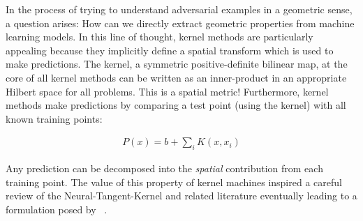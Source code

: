 






In the process of trying to understand adversarial examples in a
geometric sense, a question arises: How can we directly extract
geometric properties from machine learning models. In this line of
thought, kernel methods are particularly appealing because they
implicitly define a spatial transform which is used to make
predictions. The kernel, a symmetric positive-definite bilinear map,
at the core of all kernel methods can be written as an inner-product
in an appropriate Hilbert space for all problems. This is a spatial
metric! Furthermore, kernel methods make predictions by comparing a
test point (using the kernel) with all known training points:

\begin{align}
  P(x) = b + \sum_i K(x, x_i)
\end{align}

Any prediction can be decomposed into the \emph{spatial}
contribution from each training point. The value of this property of kernel machines inspired a careful review of the Neural-Tangent-Kernel
and related literature eventually leading to a formulation posed by ~\citet{domingos2020every}. 

